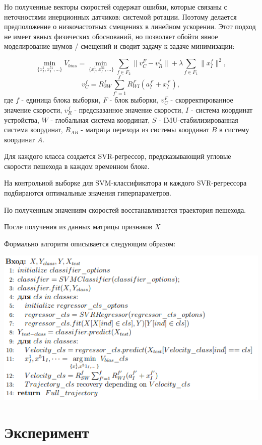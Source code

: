 \documentclass{article}
\begin{document}
Но полученные векторы скоростей содержат ошибки, которые связаны с неточностями инерционных датчиков: системой ротации. Поэтому делается предположение о низкочастотных смещениях в линейном ускорении. Этот подход не имеет явных физических обоснований, но позволяет обойти явное моделирование шумов / смещений и сводит задачу к задаче минимизации:

\[\min_{\{x^1_I, x^51_I,\dots\}}V_{bias}=
\min_{\{x^1_I, x^51_I,\dots\}}\sum_{f \in F_2}\|v_C^F-v_R^f\|+
\lambda\sum_{f \in F_1}\|x^f_I\|^2,\]
\[v_C^f = R_{SW}^f\sum_{f'=1}^f R_{WI}^{f'}(a_I^{f'}+x_I^{f'}),\]
где $f$ - единица блока выборки, $F$ - блок выборки, $v_C^F$ - скорректированное значение скорости, $v_R^f$ - предсказанное значение скорости, $I$ - система координат устройства, $W$ - глобальная система координат, $S$ - IMU-стабилизированная система координат, $R_{AB}$ - матрица перехода из системы координат $B$ в систему координат $A$.

\bigskip

Для каждого класса создается SVR-регрессор, предсказывающий угловые скорости пешехода в каждом временном блоке. 

На контрольной выборке для SVM-классификатора и каждого SVR-регрессора подбираются оптимальные значения гиперпараметров.

По полученным значениям скоростей восстанавливается траектория пешехода.

После получения из данных матрицы признаков $X$

Формально алгоритм описывается следующим образом: 


\includegraphics{new}

\section{Эксперимент}
\end{document}
